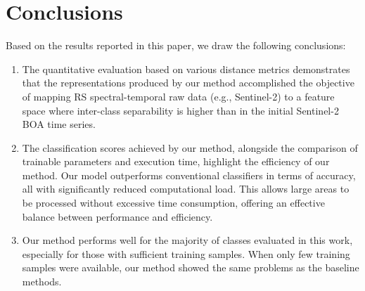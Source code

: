 \documentclass[journal,article,submit,pdftex,moreauthors]{Definitions/mdpi}
\begin{document}
\section{Conclusions}
Based on the results reported in this paper, we draw the following conclusions:
\begin{enumerate}
	\item The quantitative evaluation based on various distance metrics demonstrates that the representations produced by our method accomplished the objective of mapping RS spectral-temporal raw data (e.g., Sentinel-2) to a feature space where inter-class separability is higher than in the initial Sentinel-2 BOA time series.
    \item The classification scores achieved by our method, alongside the comparison of trainable parameters and execution time, highlight the efficiency of our method. Our model outperforms conventional classifiers in terms of accuracy, all with significantly reduced computational load. This allows large areas to be processed without excessive time consumption, offering an effective balance between performance and efficiency.
    \item Our method performs well for the majority of classes evaluated in this work, especially for those with sufficient training samples. When only few training samples were available, our method showed the same problems as the baseline methods.
\end{enumerate}
\end{document}
